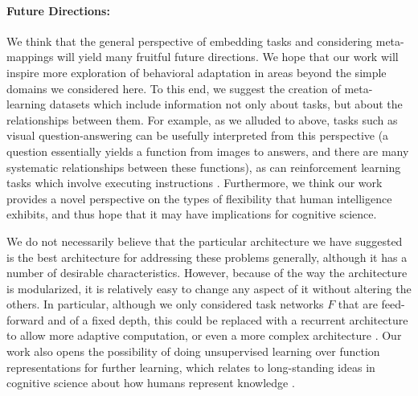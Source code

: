 \documentclass{article}
\begin{document}
\paragraph{Future Directions:} We think that the general perspective of embedding tasks and considering meta-mappings will yield many fruitful future directions. We hope that our work will inspire more exploration of behavioral adaptation in areas beyond the simple domains we considered here. To this end, we suggest the creation of meta-learning datasets which include information not only about tasks, but about the relationships between them. For example, as we alluded to above, tasks such as visual question-answering \citep[e.g.][]{Antol2015} can be usefully interpreted from this perspective (a question essentially yields a function from images to answers, and there are many systematic relationships between these functions), as can reinforcement learning tasks which involve executing instructions \citep[e.g.][]{Hermann2017, Co-Reyes2019}. Furthermore, we think our work provides a novel perspective on the types of flexibility that human intelligence exhibits, and thus hope that it may have implications for cognitive science. \par 
We do not necessarily believe that the particular architecture we have suggested is the best architecture for addressing these problems generally, although it has a number of desirable characteristics. However, because of the way the architecture is modularized, it is relatively easy to change any aspect of it without altering the others. In particular, although we only considered task networks $F$ that are feed-forward and of a fixed depth, this could be replaced with a recurrent architecture to allow more adaptive computation, or even a more complex architecture \citep[e.g.][]{Reed2015, Graves2016}. Our work also opens the possibility of doing unsupervised learning over function representations for further learning, which relates to long-standing ideas in cognitive science about how humans represent knowledge \citep{Clark1993}. \par 
\vspace{-1em}
\end{document}
